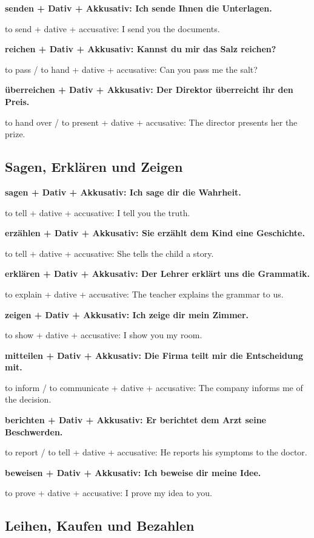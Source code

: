 \documentclass[a4paper]{article}
\newcommand{\EN}[1]{\par{\small\textcolor{TranslationGray}{#1}}\vspace{0.4em}}
\begin{document}
            \textbf{senden + Dativ + Akkusativ: Ich sende Ihnen die Unterlagen.}
            \EN{to send + dative + accusative: I send you the documents.}
            
            \textbf{reichen + Dativ + Akkusativ: Kannst du mir das Salz reichen?}
            \EN{to pass / to hand + dative + accusative: Can you pass me the salt?}
            
            \textbf{überreichen + Dativ + Akkusativ: Der Direktor überreicht ihr den Preis.}
            \EN{to hand over / to present + dative + accusative: The director presents her the prize.}
        
        \subsection{Sagen, Erklären und Zeigen}
            
            \textbf{sagen + Dativ + Akkusativ: Ich sage dir die Wahrheit.}
            \EN{to tell + dative + accusative: I tell you the truth.}
            
            \textbf{erzählen + Dativ + Akkusativ: Sie erzählt dem Kind eine Geschichte.}
            \EN{to tell + dative + accusative: She tells the child a story.}
            
            \textbf{erklären + Dativ + Akkusativ: Der Lehrer erklärt uns die Grammatik.}
            \EN{to explain + dative + accusative: The teacher explains the grammar to us.}
            
            \textbf{zeigen + Dativ + Akkusativ: Ich zeige dir mein Zimmer.}
            \EN{to show + dative + accusative: I show you my room.}
            
            \textbf{mitteilen + Dativ + Akkusativ: Die Firma teilt mir die Entscheidung mit.}
            \EN{to inform / to communicate + dative + accusative: The company informs me of the decision.}
            
            \textbf{berichten + Dativ + Akkusativ: Er berichtet dem Arzt seine Beschwerden.}
            \EN{to report / to tell + dative + accusative: He reports his symptoms to the doctor.}
            
            \textbf{beweisen + Dativ + Akkusativ: Ich beweise dir meine Idee.}
            \EN{to prove + dative + accusative: I prove my idea to you.}
        
        \subsection{Leihen, Kaufen und Bezahlen}
            
\end{document}
